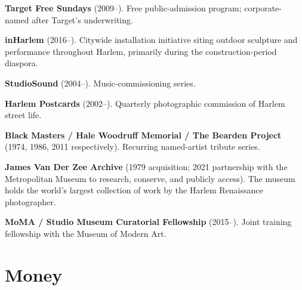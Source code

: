 \documentclass[10pt,letterpaper,twocolumn]{article}
\begin{document}
\textbf{Target Free Sundays} (2009--). Free public-admission program; corporate-named after Target's underwriting.

\textbf{inHarlem} (2016--). Citywide installation initiative siting outdoor sculpture and performance throughout Harlem, primarily during the construction-period diaspora.

\textbf{StudioSound} (2004--). Music-commissioning series.

\textbf{Harlem Postcards} (2002--). Quarterly photographic commission of Harlem street life.

\textbf{Black Masters / Hale Woodruff Memorial / The Bearden Project} (1974, 1986, 2011 respectively). Recurring named-artist tribute series.

\textbf{James Van Der Zee Archive} (1979 acquisition; 2021 partnership with the Metropolitan Museum to research, conserve, and publicly access). The museum holds the world's largest collection of work by the Harlem Renaissance photographer.

\textbf{MoMA / Studio Museum Curatorial Fellowship} (2015--). Joint training fellowship with the Museum of Modern Art.

\section{Money}\label{sec:money}
\end{document}
